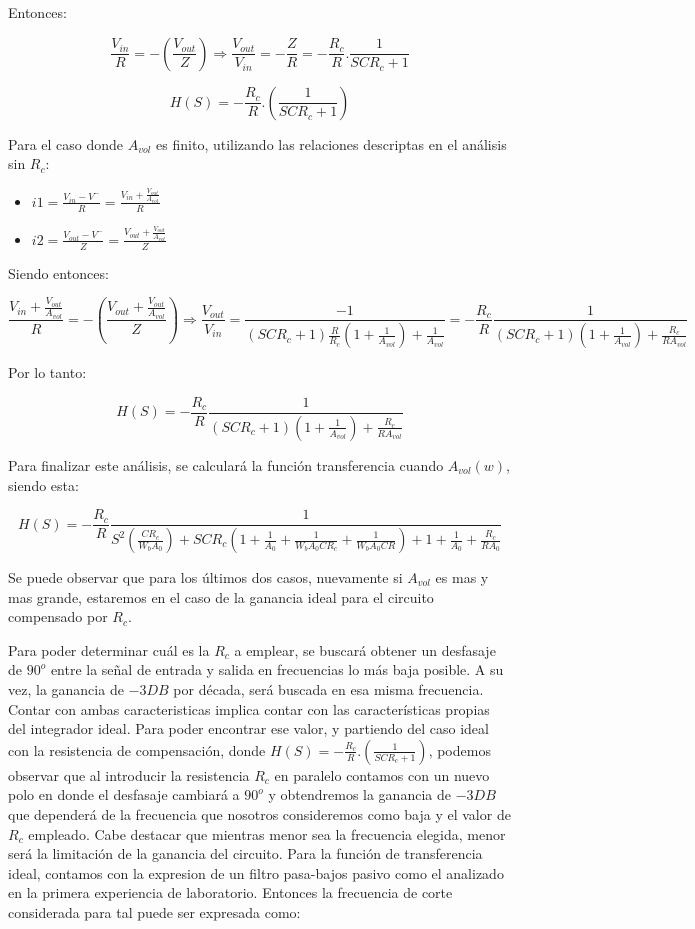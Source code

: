 Entonces:

$$ \frac{V_{in}}{R} = - (\frac{V_{out}}{Z}) \Longrightarrow \frac{V_{out}}{V_{in}} = -\frac{Z}{R} = - \frac{R_c}{R}.\frac{1}{SCR_c+1}$$

$$ H(S) = - \frac{R_c}{R}.(\frac{1}{SCR_c+1})$$

Para el caso donde $A_{vol}$ es finito, utilizando las relaciones descriptas en el análisis sin $R_c$:

\begin{itemize}
	\item $i1 = \frac {V_{in}-V^{-}}{R} =  \frac {V_{in} + \frac{V_{out}}{A_{vol}}}{R}$
	\item $i2 = \frac {V_{out}-V^{-}}{Z} = \frac {V_{out} + \frac{V_{out}}{A_{vol}}}{Z}$
\end{itemize}

Siendo entonces:

$$ \frac {V_{in} + \frac{V_{out}}{A_{vol}}}{R} = -(\frac {V_{out} + \frac{V_{out}}{A_{vol}}}{Z})
\Longrightarrow \frac{V_{out}}{V_{in}} = \frac{-1}{(SCR_c+1)\frac{R}{R_c}(1+\frac{1}{A_{vol}})+\frac{1}{A_{vol}}} = 
-\frac{R_c}{R}\frac{1}{(SCR_c+1)(1+\frac{1}{A_{vol}})+\frac{R_c}{RA_{vol}}} $$

Por lo tanto:

$$H(S)= -\frac{R_c}{R}\frac{1}{(SCR_c+1)(1+\frac{1}{A_{vol}})+\frac{R_c}{RA_{vol}}} $$

Para finalizar este análisis, se calculará la función transferencia cuando $A_{vol}(w)$, siendo esta:

$$H(S)=-\frac{R_c}{R}\frac{1}{S^2(\frac{CR_c}{W_bA_0})+SCR_c(1+\frac{1}{A_0}+\frac{1}{W_bA_0CR_c}+\frac{1}{W_bA_0CR})+1+\frac{1}{A_0}+\frac{R_c}{RA_0}}$$

Se puede observar que para los últimos dos casos, nuevamente si $A_{vol}$ es mas y mas grande, estaremos en el caso de la ganancia ideal para el circuito compensado
por $R_c$.


Para poder determinar cuál es la $R_c$ a emplear, se buscará obtener un desfasaje de $90^o$ entre la señal de entrada y salida en frecuencias lo más baja posible.
A su vez, la ganancia de $-3DB$ por década, será buscada en esa misma frecuencia.
Contar con ambas caracteristicas implica contar con las características propias del integrador ideal. 
Para poder encontrar ese valor, y partiendo del caso ideal con la resistencia
de compensación, donde $ H(S) = - \frac{R_c}{R}.(\frac{1}{SCR_c+1})$, podemos observar que al introducir la resistencia $R_c$
en paralelo contamos con un nuevo polo en donde el desfasaje cambiará a $90^o$ y obtendremos la ganancia de $-3DB$ que dependerá de la frecuencia que nosotros consideremos como baja y el valor de $R_c$ empleado.
Cabe destacar que mientras menor sea la frecuencia elegida, menor será la limitación de la ganancia del circuito.
Para la función de transferencia ideal, contamos con la expresion de un filtro pasa-bajos pasivo como el analizado en la primera experiencia
de laboratorio. Entonces la frecuencia de corte considerada para tal puede ser expresada como:


